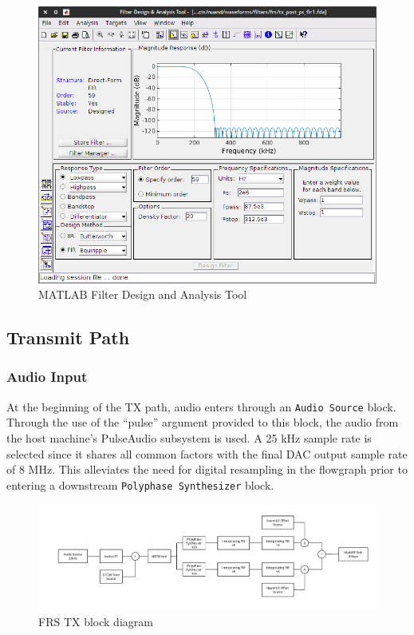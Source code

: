 \begin{figure}[h]
  \centering
  \includegraphics[width=5in]{images/fdatool.png}
  \caption{MATLAB Filter Design and Analysis Tool}
  \label{fig:fdatool}
\end{figure}

\cleardoublepage

\subsection{Transmit Path}

\subsubsection{Audio Input}
At the beginning of the TX path, audio enters through an \texttt{Audio Source}
block. Through the use of the ``pulse'' argument provided to this block, the
audio from the host machine's PulseAudio \cite{PULSE_AUDIO} subsystem is used.
A 25 kHz sample rate is selected
since it shares all common factors with the final DAC output sample  rate of 8 MHz.
This alleviates the need for digital resampling in the flowgraph prior to entering
a downstream \texttt{Polyphase Synthesizer} block.

\begin{figure}[h]
  \centering
  \includegraphics[width=6.5in]{images/frs/bladeRF_FRS_TX_block_diagram.pdf}
  \caption{FRS TX block diagram}
  \label{fig:frs_tx_block_diagram}
\end{figure}

